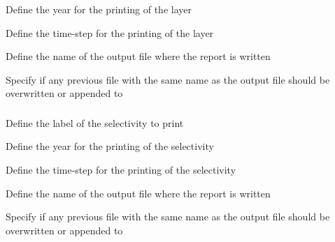  {Define the year for the printing of the layer}

 {Define the time-step for the printing of the layer}

 {Define the name of the output file where the report is written}

 {Specify if any previous file with the same name as the output file should be overwritten or appended to}

\subsubsection[Print a selectivity]{}

 {Define the label of the selectivity to print}

 {Define the year for the printing of the selectivity}

 {Define the time-step for the printing of the selectivity}

 {Define the name of the output file where the report is written}

 {Specify if any previous file with the same name as the output file should be overwritten or appended to}

\subsubsection[Print the random number seed used]{}

